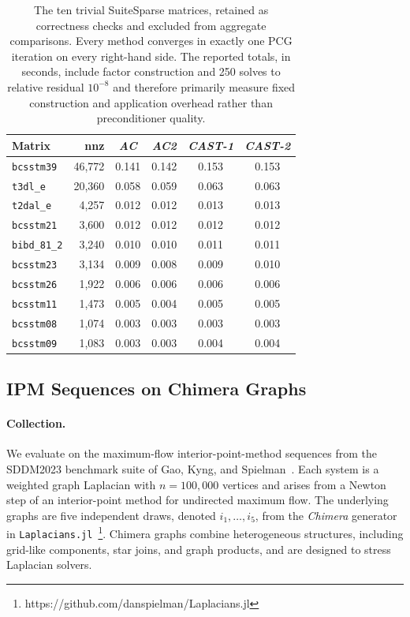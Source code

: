 \documentclass{article}
\newcommand{\CASTone}{\textit{CAST-1}\xspace}
\newcommand{\CASTtwo}{\textit{CAST-2}\xspace}
\newcommand{\AC}{\textit{AC}\xspace}
\newcommand{\ACtwo}{\textit{AC2}\xspace}
\newcommand{\1}{\mathbbm{1}}
\theoremstyle{plain}
\begin{document}
\begin{table}[t]
\centering
\caption{The ten trivial SuiteSparse matrices, retained as
correctness checks and excluded from aggregate comparisons. Every
method converges in exactly one PCG iteration on every right-hand
side. The reported totals, in seconds, include factor construction
and 250 solves to relative residual $10^{-8}$ and therefore primarily
measure fixed construction and application overhead rather than
preconditioner quality.}
\label{tab:trivial}
\small
\begin{tabular}{l r cccc}
\toprule
Matrix & nnz & \AC & \ACtwo & \CASTone & \CASTtwo \\
\midrule
\texttt{bcsstm39}  & 46{,}772 & 0.141 & 0.142 & 0.153 & 0.153 \\
\texttt{t3dl\_e}   & 20{,}360 & 0.058 & 0.059 & 0.063 & 0.063 \\
\texttt{t2dal\_e}  &  4{,}257 & 0.012 & 0.012 & 0.013 & 0.013 \\
\texttt{bcsstm21}  &  3{,}600 & 0.012 & 0.012 & 0.012 & 0.012 \\
\texttt{bibd\_81\_2} & 3{,}240 & 0.010 & 0.010 & 0.011 & 0.011 \\
\texttt{bcsstm23}  &  3{,}134 & 0.009 & 0.008 & 0.009 & 0.010 \\
\texttt{bcsstm26}  &  1{,}922 & 0.006 & 0.006 & 0.006 & 0.006 \\
\texttt{bcsstm11}  &  1{,}473 & 0.005 & 0.004 & 0.005 & 0.005 \\
\texttt{bcsstm08}  &  1{,}074 & 0.003 & 0.003 & 0.003 & 0.003 \\
\texttt{bcsstm09}  &  1{,}083 & 0.003 & 0.003 & 0.004 & 0.004 \\
\bottomrule
\end{tabular}
\end{table}


\subsection{IPM Sequences on Chimera Graphs}
\label{sec:chimera}

\paragraph{Collection.}
We evaluate on the maximum-flow interior-point-method sequences from
the SDDM2023 benchmark suite of Gao, Kyng, and
Spielman~\cite{AC}. Each system is a weighted graph Laplacian with
$n=100{,}000$ vertices and arises from a Newton step of an
interior-point method for undirected maximum flow. The underlying
graphs are five independent draws, denoted
$i_1,\ldots,i_5$, from the \emph{Chimera} generator in
\texttt{Laplacians.jl}~\footnote{https://github.com/danspielman/Laplacians.jl}. Chimera graphs combine
heterogeneous structures, including grid-like components, star joins,
and graph products, and are designed to stress Laplacian solvers.
\end{document}
